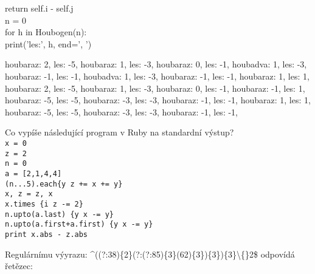 \documentclass[addpoints,12pt]{exam}
\begin{document}
\begin{questions}
{\hspace*{0.6cm}\hspace*{0.6cm}\hspace*{0.6cm}return self.i - self.j\\
n = 0\\
for h in Houbogen(n):\\
\hspace*{0.6cm}print('les:', h, end=', ')}
\nopagebreak
\begin{choices}
\choice
houbaraz: 2, les: -5, houbaraz: 1, les: -3, houbaraz: 0, les: -1,
\choice
houbadva: 1, les: -3, houbaraz: -1, les: -1,
\choice
houbadva: 1, les: -3, houbaraz: -1, les: -1, houbaraz: 1, les: 1,
\choice
houbaraz: 2, les: -5, houbaraz: 1, les: -3, houbaraz: 0, les: -1, houbaraz: -1, les: 1,
\choice
houbaraz: -5, les: -5, houbaraz: -3, les: -3, houbaraz: -1, les: -1, houbaraz: 1, les: 1,
\choice
houbaraz: -5, les: -5, houbaraz: -3, les: -3, houbaraz: -1, les: -1,
\end{choices}
\question[2]
Co vypíše následující program v Ruby na standardní výstup?\\
\texttt{x = 0\\
z = 2\\
n = 0\\
a = [2,1,4,4]\\
(n...5).each\{\textbar{}y\textbar{} z += x += y\}\\
x, z = z, x\\
x.times \{\textbar{}i\textbar{} z -= 2\}\\
n.upto(a.last) \{\textbar{}y\textbar{} x -= y\}\\
n.upto(a.first+a.first) \{\textbar{}y\textbar{} x -= y\}\\
print x.abs - z.abs}
\nopagebreak
\begin{choices}
\end{choices}
\question[2]
Regulárnímu výyrazu: \^{}((?:38)\{2\}(?:(?:85)\{3\}(62)\{3\})\{3\})\{3\}\textbackslash\{\}2\${} odpovídá řetězec:
\nopagebreak
\begin{choices}

\end{choices}
\end{questions}
\end{document}
